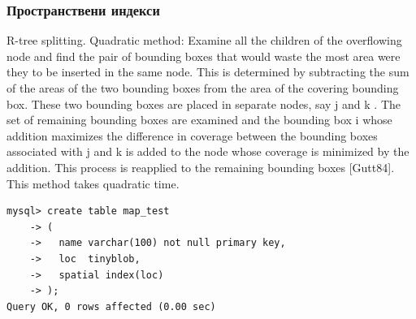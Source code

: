 \documentclass{beamer}
\begin{document}
\begin{frame}
 \frametitle{Пространствени индекси}
  R-tree splitting. 
Quadratic method: Examine all the children of the overflowing node and find the pair of bounding boxes that would waste
 the most area were they to be inserted in the same node. This is determined by subtracting the sum of the areas of the
 two bounding boxes from the area of the covering bounding box. These two bounding boxes are placed in separate nodes,
 say j and k . The set of remaining bounding boxes are examined and the bounding box i whose addition maximizes the
 difference in coverage between the bounding boxes associated with j and k is added to the node whose coverage is
 minimized by the addition. This process is reapplied to the remaining bounding boxes [Gutt84]. This method takes
 quadratic time.

\end{frame}

\begin{frame}[fragile]
\begin{verbatim}
mysql> create table map_test
    -> (
    ->   name varchar(100) not null primary key,
    ->   loc  tinyblob,
    ->   spatial index(loc)
    -> );
Query OK, 0 rows affected (0.00 sec)
\end{verbatim}
\end{frame}
\end{document}
